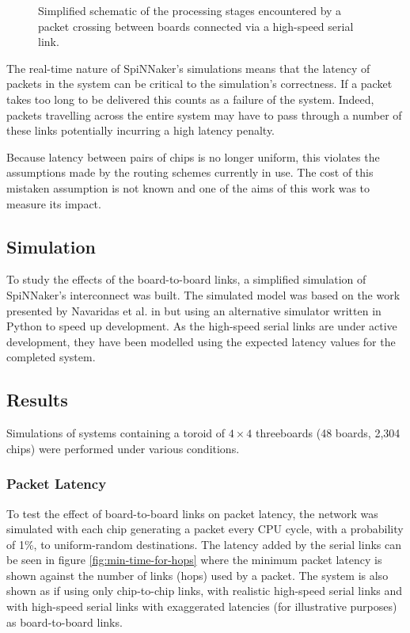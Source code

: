 		\begin{figure}
			\center
			
			\caption[SpiNNaker high-speed serial board-to-board
			link schematic.]{Simplified schematic of the processing stages encountered by a
			packet crossing between boards connected via a high-speed serial link.}
			\label{fig:boardToBoardSchematic}
		\end{figure}
		
		The real-time nature of SpiNNaker's simulations means that the latency of
		packets in the system can be critical to the simulation's correctness. If a
		packet takes too long to be delivered this counts as a failure of the
		system. Indeed, packets travelling across the entire system may have to pass
		through a number of these links potentially incurring a high latency
		penalty.
		
		Because latency between pairs of chips is no longer uniform, this violates
		the assumptions made by the routing schemes currently in use. The cost of
		this mistaken assumption is not known and one of the aims of this work was
		to measure its impact.
		
		\subsection{Simulation}
			
			To study the effects of the board-to-board links, a simplified simulation
			of SpiNNaker's interconnect was built. The simulated model was based on
			the work presented by Navaridas et al. in \cite{navaridas09} but using an
			alternative simulator written in Python to speed up development. As the
			high-speed serial links are under active development, they have been
			modelled using the expected latency values for the completed system.
			
		\subsection{Results}
			
			Simulations of systems containing a toroid of $4\times4$ threeboards (48
			boards, 2,304 chips) were performed under various conditions.
			
			\subsubsection{Packet Latency}
			
				To test the effect of board-to-board links on packet latency, the
				network was simulated with each chip generating a packet every CPU
				cycle, with a probability of 1\%, to uniform-random destinations. The
				latency added by the serial links can be seen in figure
				\ref{fig:min-time-for-hops} where the minimum packet latency is shown
				against the number of links (hops) used by a packet. The system is also
				shown as if using only chip-to-chip links, with realistic high-speed
				serial links and with high-speed serial links with exaggerated latencies
				(for illustrative purposes) as board-to-board links.
				
